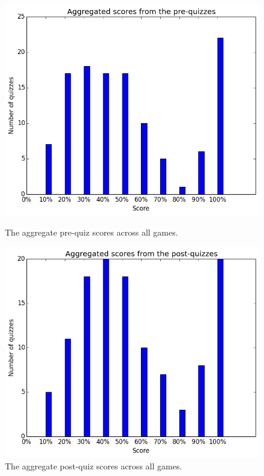 			\begin{figure}[h] 
			\centering 
			\begin{minipage}[b]{0.45\linewidth}
			\includegraphics[width=\textwidth]{general_pre.png} 
			\caption{The aggregate pre-quiz scores across all games.}
			\end{minipage}
			\quad
			\begin{minipage}[b]{0.45\linewidth}
			\includegraphics[width=\textwidth]{general_post.png} 
			\caption{The aggregate post-quiz scores across all games.}
			\end{minipage}
			\end{figure}

